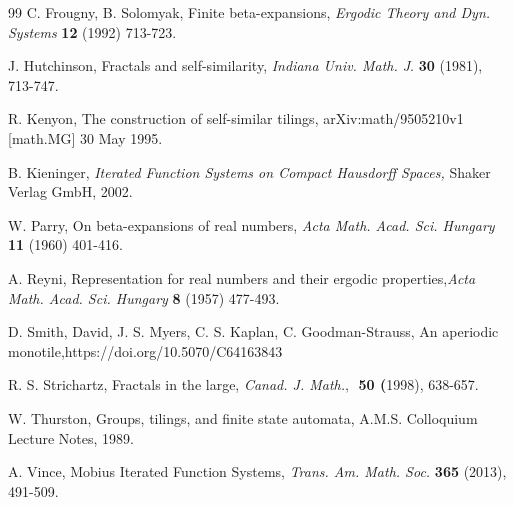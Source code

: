 \documentclass{amsproc}%
\theoremstyle{plain}
\theoremstyle{definition}
\numberwithin{equation}{section}
\begin{document}
\begin{thebibliography}{99}
C. Frougny, B. Solomyak, Finite beta-expansions,
\textit{Ergodic Theory and Dyn. Systems} \textbf{12} (1992) 713-723.

J. Hutchinson, Fractals and self-similarity,
\textit{Indiana Univ. Math. J}. \textbf{30} (1981), 713-747.

R. Kenyon, The construction of self-similar tilings,
arXiv:math/9505210v1 [math.MG] 30 May 1995.

B. Kieninger, \textit{Iterated Function Systems on Compact
Hausdorff Spaces, }Shaker Verlag GmbH, 2002.

W. Parry, On beta-expansions of real numbers, \textit{Acta
Math. Acad. Sci. Hungary} \textbf{11} (1960) 401-416.

A. Reyni, Representation for real numbers and their ergodic
properties,\textit{Acta Math. Acad. Sci. Hungary} \textbf{8} (1957) 477-493.

D. Smith, David, J. S. Myers, C. S. Kaplan, C.
Goodman-Strauss, An aperiodic monotile,https://doi.org/10.5070/C64163843

R. S. Strichartz, Fractals in the large, \textit{Canad.
J. Math.}$,$\textit{\ }\textbf{50 (}1998), 638-657.

W. Thurston, Groups, tilings, and finite state automata,
A.M.S. Colloquium Lecture Notes, 1989.

A. Vince, Mobius Iterated Function Systems, \textit{Trans. Am.
Math. Soc. }\textbf{365}\textit{ }(2013), 491-509.
\end{thebibliography}
\end{document}
